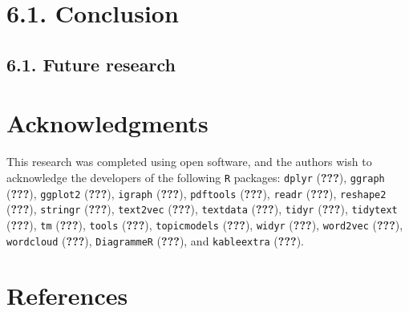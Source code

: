 \documentclass[]{elsarticle} %
\begin{document}
\hypertarget{conclusion}{%
\section{6.1. Conclusion}\label{conclusion}}

\hypertarget{future-research}{%
\subsection{6.1. Future research}\label{future-research}}

\hypertarget{acknowledgments}{%
\section{Acknowledgments}\label{acknowledgments}}

This research was completed using open software, and the authors wish to
acknowledge the developers of the following \texttt{R} packages:
\texttt{dplyr} ({\textbf{???}}), \texttt{ggraph} ({\textbf{???}}),
\texttt{ggplot2} ({\textbf{???}}), \texttt{igraph} ({\textbf{???}}),
\texttt{pdftools} ({\textbf{???}}), \texttt{readr} ({\textbf{???}}),
\texttt{reshape2} ({\textbf{???}}), \texttt{stringr} ({\textbf{???}}),
\texttt{text2vec} ({\textbf{???}}), \texttt{textdata} ({\textbf{???}}),
\texttt{tidyr} ({\textbf{???}}), \texttt{tidytext} ({\textbf{???}}),
\texttt{tm} ({\textbf{???}}), \texttt{tools} ({\textbf{???}}),
\texttt{topicmodels} ({\textbf{???}}), \texttt{widyr} ({\textbf{???}}),
\texttt{word2vec} ({\textbf{???}}), \texttt{wordcloud} ({\textbf{???}}),
\texttt{DiagrammeR} ({\textbf{???}}), and \texttt{kableextra}
({\textbf{???}}).

\hypertarget{references}{%
\section{References}\label{references}}
\end{document}
